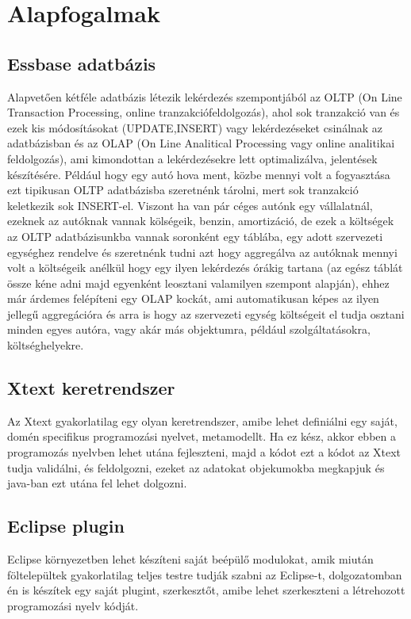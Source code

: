 \chapter{Alapfogalmak}\label{sect:Preliminaries}
\section{Essbase adatbázis}
Alapvetően kétféle adatbázis létezik lekérdezés szempontjából az OLTP (On Line
Transaction Processing, online tranzakciófeldolgozás), ahol sok tranzakció van és ezek kis
módosításokat (UPDATE,INSERT) vagy lekérdezéseket csinálnak az
adatbázisban és az OLAP (On Line Analitical Processing vagy online
analitikai feldolgozás), ami kimondottan a lekérdezésekre lett optimalizálva,
jelentések készítésére. Például hogy egy autó hova ment, közbe mennyi volt a
fogyasztása ezt tipikusan OLTP adatbázisba szeretnénk tárolni, mert sok
tranzakció keletkezik sok INSERT-el. Viszont ha van pár céges autónk egy vállalatnál, ezeknek az autóknak vannak kölségeik, 
benzin, amortizáció, de ezek a költségek az OLTP adatbázisunkba vannak soronként
egy táblába, egy adott szervezeti egységhez rendelve és szeretnénk tudni azt
hogy aggregálva az autóknak mennyi volt a költségeik anélkül hogy egy ilyen
lekérdezés órákig tartana (az egész táblát össze kéne adni majd egyenként
leosztani valamilyen szempont alapján), ehhez már árdemes felépíteni egy OLAP
kockát, ami automatikusan képes az ilyen jellegű aggregációra és arra is hogy az
szervezeti egység költségeit el tudja osztani minden egyes autóra, vagy akár más
objektumra, például szolgáltatásokra, költséghelyekre.

\section{Xtext keretrendszer}
Az Xtext gyakorlatilag egy olyan keretrendszer, amibe lehet definiálni egy
saját, domén specifikus programozási nyelvet, metamodellt. Ha ez kész, akkor
ebben a programozás nyelvben lehet utána fejleszteni, majd a kódot ezt a kódot az Xtext tudja validálni, 
és feldolgozni, ezeket az adatokat objekumokba megkapjuk és java-ban ezt utána
fel lehet dolgozni.

\section{Eclipse plugin}
Eclipse környezetben lehet készíteni saját beépülő modulokat, amik miután
föltelepültek gyakorlatilag teljes testre tudják szabni az Eclipse-t,
dolgozatomban én is készítek egy saját plugint, szerkesztőt, amibe lehet
szerkeszteni a létrehozott programozási nyelv kódját.


